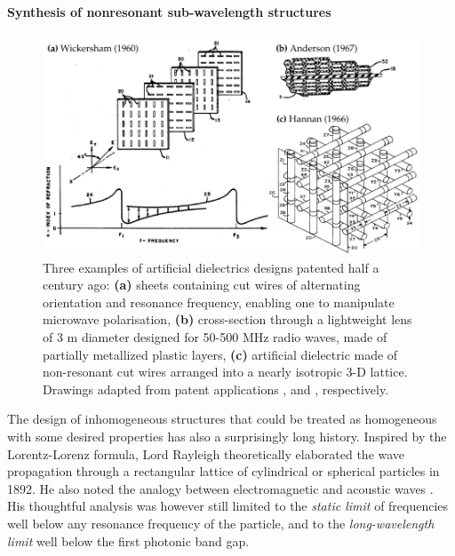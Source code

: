\paragraph{Synthesis of nonresonant sub-wavelength structures} %
\begin{figure}[h] \caption{Three examples of artificial dielectrics designs patented half a century ago: \textbf{(a)} sheets containing cut wires of alternating orientation and resonance frequency, enabling one to manipulate microwave polarisation, \textbf{(b)} cross-section through a lightweight lens of 3 m diameter designed for 50-500 MHz radio waves, made of partially metallized plastic layers, \textbf{(c)} artificial dielectric made of non-resonant cut wires arranged into a nearly isotropic 3-D lattice. Drawings adapted from patent applications \cite{wickersham1960artificial},  \cite{anderson1967artificial} and \cite{hannan1966artificial}, respectively.} \label{fg_mm_patents} \centering \includegraphics[width=\textwidth]{img/patents/mm_patents.pdf} \end{figure}

The design of inhomogeneous structures that could be treated as homogeneous with some desired properties has also a surprisingly long history. 
Inspired by the Lorentz-Lorenz formula, Lord Rayleigh theoretically elaborated the wave propagation through a rectangular lattice of cylindrical or spherical particles in 1892. He also noted the analogy between electromagnetic and acoustic waves \cite[p. 498]{rayleigh1892}. His thoughtful analysis was however still limited to the \textit{static limit} of frequencies well below any resonance frequency of the particle, and to the \textit{long-wavelength limit} well below the first photonic band gap. 


